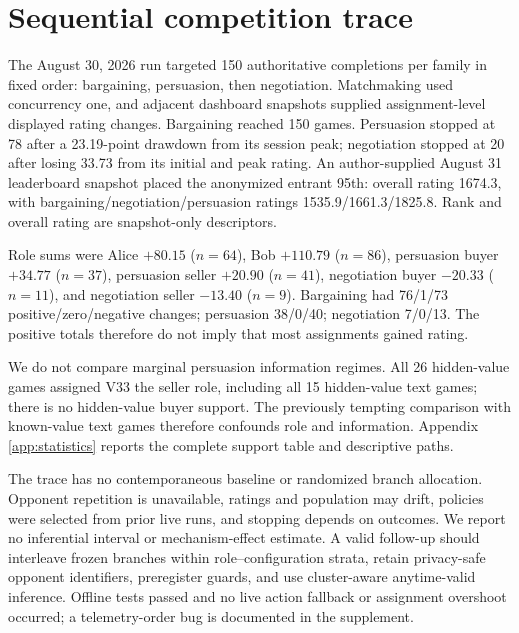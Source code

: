 \section{Sequential competition trace}



The August 30, 2026 run targeted 150 authoritative completions per family in
fixed order: bargaining, persuasion, then negotiation. Matchmaking used
concurrency one, and adjacent dashboard snapshots supplied assignment-level
displayed rating changes. Bargaining reached 150 games. Persuasion stopped at
78 after a 23.19-point drawdown from its session peak; negotiation stopped at
20 after losing 33.73 from its initial and peak rating.
An author-supplied August 31 leaderboard snapshot placed the anonymized entrant
95th: overall rating 1674.3, with bargaining/negotiation/persuasion ratings
1535.9/1661.3/1825.8. Rank and overall rating are snapshot-only descriptors.

Role sums were Alice $+80.15$ ($n=64$), Bob $+110.79$ ($n=86$), persuasion
buyer $+34.77$ ($n=37$), persuasion seller $+20.90$ ($n=41$), negotiation buyer
$-20.33$ ($n=11$), and negotiation seller $-13.40$ ($n=9$). Bargaining had
76/1/73 positive/zero/negative changes; persuasion 38/0/40; negotiation 7/0/13.
The positive totals therefore do not imply that most assignments gained rating.

We do not compare marginal persuasion information regimes. All 26 hidden-value
games assigned V33 the seller role, including all 15 hidden-value text games;
there is no hidden-value buyer support. The previously tempting comparison with
known-value text games therefore confounds role and information. Appendix~
\ref{app:statistics} reports the complete support table and descriptive paths.

The trace has no contemporaneous baseline or randomized branch allocation.
Opponent repetition is unavailable, ratings and population may drift, policies
were selected from prior live runs, and stopping depends on outcomes. We report
no inferential interval or mechanism-effect estimate. A valid follow-up should
interleave frozen branches within role--configuration strata, retain privacy-safe
opponent identifiers, preregister guards, and use cluster-aware anytime-valid
inference. Offline tests passed and no live action fallback or assignment
overshoot occurred; a telemetry-order bug is documented in the supplement.
